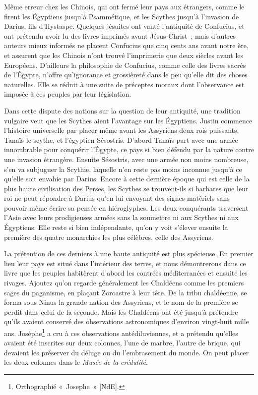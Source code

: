 \documentclass[french,twoside]{book} %
\begin{document}
Même erreur chez les Chinois, qui ont fermé leur pays aux étrangers, comme le firent les Égyptiens jusqu’à Psammétique, et les Scythes jusqu’à l’invasion de Darius, fils d’Hystaspe. Quelques jésuites ont vanté l’antiquité de Confucius, et ont prétendu avoir lu des livres imprimés avant Jésus-Christ ; mais d’autres auteurs mieux informés ne placent Confucius que cinq cents ans avant notre ère, et assurent que les Chinois n’ont trouvé l’imprimerie que deux siècles avant les Européens. D’ailleurs la philosophie de Confucius, comme celle des livres sacrés de l’Égypte, n’offre qu’ignorance et grossièreté dans le peu qu’elle dit des choses naturelles. Elle se réduit à une suite de préceptes moraux dont l’observance est imposée à ces peuples par leur législation.\par
Dans cette dispute des nations sur la question de leur antiquité, une tradition vulgaire veut que les Scythes aient l’avantage sur les Égyptiens. Justin commence l’histoire universelle par placer même avant les Assyriens deux rois puissants, Tanaïs le scythe, et l’égyptien Sésostris. D’abord Tanaïs part avec une armée innombrable pour conquérir l’Égypte, ce pays si bien défendu par la nature contre une invasion étrangère. Ensuite Sésostris, avec une armée non moins nombreuse, s’en va subjuguer la Scythie, laquelle n’en reste pas moins inconnue jusqu’à ce qu’elle soit envahie par Darius. Encore  à cette dernière époque qui est celle de la plus haute civilisation des Perses, les Scythes se trouvent-ils si barbares que leur roi ne peut répondre à Darius qu’en lui envoyant des signes matériels sans pouvoir même écrire sa pensée en hiéroglyphes. Les deux conquérants traversent l’Asie avec leurs prodigieuses armées sans la soumettre ni aux Scythes ni aux Égyptiens. Elle reste si bien indépendante, qu’on y voit s’élever ensuite la première des quatre monarchies les plus célèbres, celle des Assyriens.\par
La prétention de ces derniers à une haute antiquité est plus spécieuse. En premier lieu leur pays est situé dans l’intérieur des terres, et nous démontrerons dans ce livre que les peuples habitèrent d’abord les contrées méditerranées et ensuite les rivages. Ajoutez qu’on regarde généralement les Chaldéens comme les premiers sages du paganisme, en plaçant Zoroastre à leur tête. De la tribu chaldéenne, se forma sous Ninus la grande nation des Assyriens, et le nom de la première se perdit dans celui de la seconde. Mais les Chaldéens ont été jusqu’à prétendre qu’ils avaient conservé des observations astronomiques d’environ vingt-huit mille ans. Josèphe\footnote{Orthographié « Josephe » [NdE].} a cru à ces observations antédiluviennes, et a prétendu qu’elles avaient été inscrites sur deux colonnes, l’une de marbre, l’autre de brique, qui devaient les préserver du déluge ou du l’embrasement du monde. On peut placer les deux colonnes dans le {\itshape Musée de la crédulité}.\par
\end{document}
